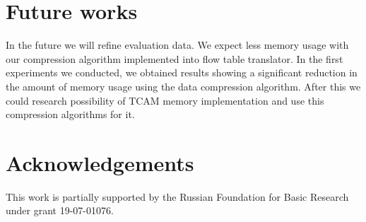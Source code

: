 \documentclass[conference]{IEEEtran}
\begin{document}
    \section{Future works}
        In the future we will refine evaluation data. 
        We expect less memory usage with our compression algorithm implemented into flow table translator. 
        In the first experiments we conducted, we obtained results showing a significant reduction in the amount 
        of memory usage using the data compression algorithm. After this we could research possibility 
        of TCAM memory implementation and use this compression algorithms for it.
    \section{Acknowledgements}
        This work is partially supported by the Russian Foundation for Basic Research under grant 19-07-01076.
\printbibliography{}
\end{document}
